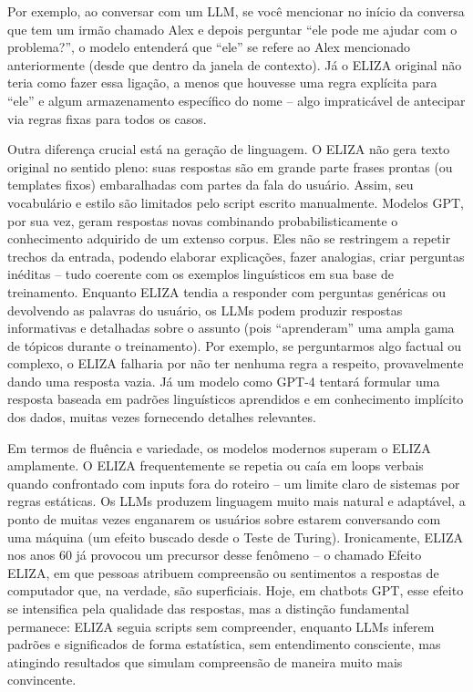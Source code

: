 \documentclass[14pt,a4paper,oneside]{book}
\begin{document}
Por exemplo, ao conversar com um LLM, se você mencionar no início da conversa que tem um irmão chamado Alex e depois perguntar “ele pode me ajudar com o problema?”, o modelo entenderá que “ele” se refere ao Alex mencionado anteriormente (desde que dentro da janela de contexto). Já o ELIZA original não teria como fazer essa ligação, a menos que houvesse uma regra explícita para “ele” e algum armazenamento específico do nome – algo impraticável de antecipar via regras fixas para todos os casos.

Outra diferença crucial está na geração de linguagem. O ELIZA não gera texto original no sentido pleno: suas respostas são em grande parte frases prontas (ou templates fixos) embaralhadas com partes da fala do usuário. Assim, seu vocabulário e estilo são limitados pelo script escrito manualmente. Modelos GPT, por sua vez, geram respostas novas combinando probabilisticamente o conhecimento adquirido de um extenso corpus. Eles não se restringem a repetir trechos da entrada, podendo elaborar explicações, fazer analogias, criar perguntas inéditas – tudo coerente com os exemplos linguísticos em sua base de treinamento. Enquanto ELIZA tendia a responder com perguntas genéricas ou devolvendo as palavras do usuário, os LLMs podem produzir respostas informativas e detalhadas sobre o assunto (pois “aprenderam” uma ampla gama de tópicos durante o treinamento). Por exemplo, se perguntarmos algo factual ou complexo, o ELIZA falharia por não ter nenhuma regra a respeito, provavelmente dando uma resposta vazia. Já um modelo como GPT-4 tentará formular uma resposta baseada em padrões linguísticos aprendidos e em conhecimento implícito dos dados, muitas vezes fornecendo detalhes relevantes.

Em termos de fluência e variedade, os modelos modernos superam o ELIZA amplamente. O ELIZA frequentemente se repetia ou caía em loops verbais quando confrontado com inputs fora do roteiro – um limite claro de sistemas por regras estáticas. Os LLMs produzem linguagem muito mais natural e adaptável, a ponto de muitas vezes enganarem os usuários sobre estarem conversando com uma máquina (um efeito buscado desde o Teste de Turing). Ironicamente, ELIZA nos anos 60 já provocou um precursor desse fenômeno – o chamado Efeito ELIZA, em que pessoas atribuem compreensão ou sentimentos a respostas de computador que, na verdade, são superficiais. Hoje, em chatbots GPT, esse efeito se intensifica pela qualidade das respostas, mas a distinção fundamental permanece: ELIZA seguia scripts sem compreender, enquanto LLMs inferem padrões e significados de forma estatística, sem entendimento consciente, mas atingindo resultados que simulam compreensão de maneira muito mais convincente. 
\end{document}
